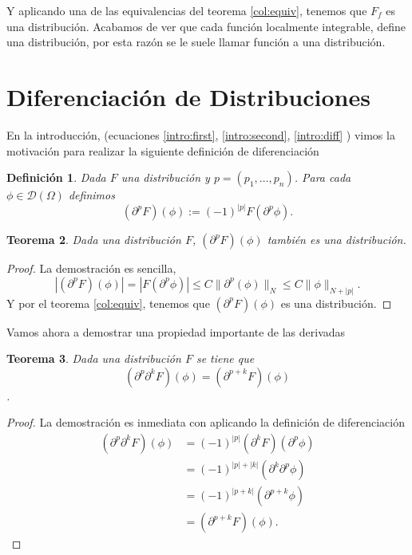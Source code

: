 \documentclass[letter,12pt]{article}
\newcommand\norm[1]{\lVert#1\rVert}
\newtheorem{theorem}{Teorema}
\newtheorem{definition}[theorem]{Definición}
\begin{document}
Y aplicando una de las equivalencias del teorema \ref{col:equiv}, tenemos que
$ F_f $ es una distribución.
Acabamos de ver que cada función localmente integrable, define una distribución,
por esta razón se le suele llamar función a una distribución.

\section{Diferenciación de Distribuciones}
En la introducción, (ecuaciones \eqref{intro:first}, \eqref{intro:second}, \eqref{intro:diff} )
vimos la motivación para realizar la siguiente definición de diferenciación
\begin{definition}
	Dada $ F $ una distribución y $ p=(p_1, \dots, p_n) $. Para cada 
	$ \phi \in \mathscr{D}(\Omega) $ definimos
	\begin{equation}\label{diff:def_diff}
		(\partial^p F)(\phi) := (-1)^{|p|} F(\partial^p{\phi}). 
	\end{equation} 
\end{definition}

\begin{theorem}\normalfont
	Dada una distribución $ F $, $ (\partial^p F)(\phi)  $ también es una distribución.
\end{theorem}
\begin{proof}
	La demostración es sencilla,  
	\begin{equation*}
		|(\partial^p F)(\phi) | = |F(\partial^p{\phi})| \leq C \norm{\partial^p(\phi)}_N
			\leq  C \norm{\phi}_{N + |p|}.
	\end{equation*}
Y por el teorema \ref{col:equiv}, tenemos que $ (\partial^p F)(\phi) $ es una
distribución.
\end{proof}
Vamos ahora a demostrar una propiedad importante de las derivadas
\begin{theorem}\normalfont
	Dada una distribución $ F $ se tiene que 
	\[ (\partial^p \partial^k F)(\phi) = (\partial^{p+k} F)(\phi) \]. 
\end{theorem}
\begin{proof}
	La demostración es inmediata con aplicando la definición de diferenciación
	\begin{equation*}
		\begin{split}
			(\partial^p \partial^k F)(\phi) &= (-1)^{|p|}(\partial^k F)(\partial^p\phi) \\
			& = (-1)^{|p| + |k|}(\partial^k \partial^p\phi) \\
			& = (-1)^{|p + k|}(\partial^{p+k}\phi) \\
			& = (\partial^{p+k}F)(\phi).
		\end{split}
	\end{equation*}
\end{proof}
\end{document}

